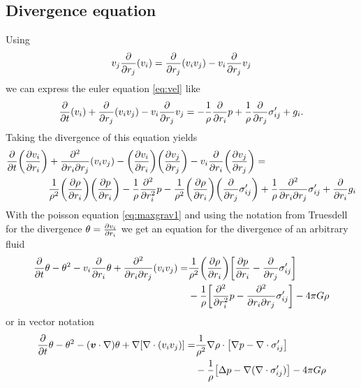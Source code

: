 \subsection{Divergence equation}
Using
\begin{align*}
v_j \pd{r_j}( v_i) = \pd{r_j}(v_i v_j) - v_i\pd{r_j}v_j
\end{align*}
we can express the euler equation \eqref{eq:vel} like
\begin{align*}
\pd{t}(v_i) +\pd{r_j}(v_i v_j) - v_i\pd{r_j}v_j = 
-\frac{1}{\rho}\pd{r_i}p + \frac{1}{\rho}\pd{r_j}\sigma'_{ij} + g_i.
\end{align*}
Taking the divergence of this equation yields
\begin{align*}
\pd{t}\lra{\ppd{r_i}{v_i}}&+\frac{\partial^2}{\partial r_i \partial r_j}(v_i
v_j)
-\lra{\ppd{r_i}{v_i}}\lra{\ppd{r_j}{v_j}}-v_i\pd{r_i}\lra{\ppd{r_j}{v_j}}=\\
&\frac{1}{\rho^2}\lra{\ppd{r_i}{\rho}}\lra{\ppd{r_i}{p}}
-\frac{1}{\rho}\pdd{r_i}p
-\frac{1}{\rho^2}\lra{\ppd{r_i}{\rho}}\lra{\pd{r_j}\sigma'_{ij}}
+\frac{1}{\rho}\frac{\partial^2}{\partial r_i \partial r_j}\sigma'_{ij}
+\pd{r_i}g_i
\end{align*}
With the poisson equation \eqref{eq:maxgrav1} and using the notation from
Truesdell for the divergence $\theta=\ppd{r_i}{v_i}$
we get an equation for the divergence of an arbitrary fluid
\begin{align}
\begin{split}
\pd{t}\theta-\theta^2-v_i\pd{r_i}\theta
+\frac{\partial^2}{\partial r_i \partial r_j}(v_i v_j) =&
\frac{1}{\rho^2}\lra{\ppd{r_i}{\rho}}
\lrb{\ppd{r_i}{p}-\pd{r_j}\sigma'_{ij}}\\
&-\frac{1}{\rho}\lrb{\pdd{r_i}p
-\frac{\partial^2}{\partial r_i \partial r_j}\sigma'_{ij}}
-4\pi G \rho
\end{split}
\end{align}
or in vector notation
\begin{align}
\begin{split}
\pd{t}\theta-\theta^2-(\vec{v}\cdot \nabla)\theta 
+\nabla\lrb{\nabla\cdot(v_i v_j)}=&
\frac{1}{\rho^2}\nabla \rho \cdot \lrb{\nabla p - \nabla \cdot \sigma'_{ij}}\\
&-\frac{1}{\rho}\lrb{\Delta p
-\nabla(\nabla \cdot \sigma'_{ij})}
-4\pi G \rho
\end{split}
\end{align}


